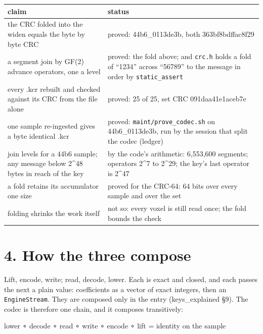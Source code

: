 {\small
\setlength{\tabcolsep}{6pt}
\begin{longtable}{>{\RaggedRight\arraybackslash}p{}>{\RaggedRight\arraybackslash}p{}}
\toprule
claim & status \\
\midrule
\endhead
the CRC folded into the widen equals the byte by byte CRC & proved: 44b6\_\allowbreak{}0113de3b, both 363bf8bdffac8f29 \\
a segment join by GF(2) advance operators, one a level & proved: the fold above; and \texttt{crc.\allowbreak{}h} holds a fold of “1234” across “56789” to the message in order by \texttt{static\_\allowbreak{}assert} \\
every .kcr rebuilt and checked against its CRC from the file alone & proved: 25 of 25, set CRC 091daa41e1aceb7e \\
one sample re-ingested gives a byte identical .kcr & proved: \texttt{maint/\allowbreak{}prove\_\allowbreak{}codec.\allowbreak{}sh} on 44b6\_\allowbreak{}0113de3b, run by the session that split the codec (ledger) \\
23 join levels for a 44b6 sample; any message below 2\textasciicircum{}48 bytes in reach of the key & by the code's arithmetic: 6,553,600 segments; operators 2\textasciicircum{}7 to 2\textasciicircum{}29; the key's last operator is 2\textasciicircum{}47 \\
a fold retains its accumulator one size & proved for the CRC-64: 64 bits over every sample and over the set \\
folding shrinks the work itself & not so: every voxel is still read once; the fold bounds the check \\
\bottomrule
\end{longtable}
}

\section{\texorpdfstring{4. How the three compose}{4. How the three compose}}

Lift, encode, write; read, decode, lower. Each is exact and closed, and each passes the next a plain value: coefficients as a vector of exact integers, then an \texttt{Engine\allowbreak{}Stream}. They are composed only in the entry (keys\_\allowbreak{}explained §9). The codec is therefore one chain, and it composes transitively:

lower ∘ decode ∘ read ∘ write ∘ encode ∘ lift  =  identity on the sample

